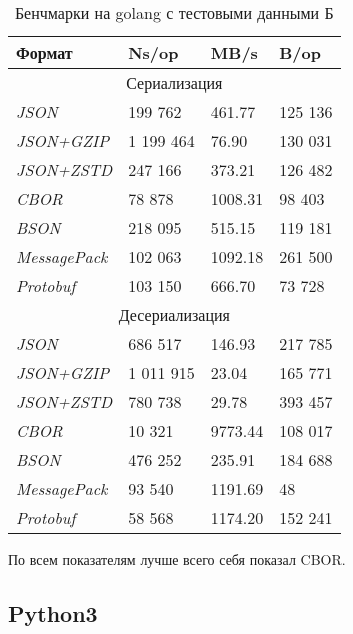 \begin{table}[ht!]
\centering
\caption{Бенчмарки на golang с тестовыми данными Б}
\begin{tabular}{|l|l|l|l|} 
\hline
\textbf{Формат}      & \textbf{Ns/op} & \textbf{MB/s} & \textbf{B/op}  \\ 
\hline
\multicolumn{4}{|c|}{Сериализация}                                        \\ 
\hline
\textit{JSON}        & 199 762         & 461.77        & 125 136         \\ 
\hline
\textit{JSON+GZIP}   & 1 199 464        & 76.90         & 130 031         \\ 
\hline
\textit{JSON+ZSTD}   & 247 166         & 373.21        & 126 482         \\ 
\hline
\textit{CBOR}        & 78 878          & 1008.31       & 98 403          \\ 
\hline
\textit{BSON}        & 218 095         & 515.15        & 119 181         \\ 
\hline
\textit{MessagePack} & 102 063         & 1092.18       & 261 500         \\ 
\hline
\textit{Protobuf}    & 103 150         & 666.70        & 73 728          \\ 
\hline
\multicolumn{4}{|c|}{Десериализация}                                      \\ 
\hline
\textit{JSON}        & 686 517         & 146.93        & 217 785         \\ 
\hline
\textit{JSON+GZIP}   & 1 011 915        & 23.04         & 165 771         \\ 
\hline
\textit{JSON+ZSTD}   & 780 738         & 29.78         & 393 457         \\ 
\hline
\textit{CBOR}        & 10 321          & 9773.44       & 108 017         \\ 
\hline
\textit{BSON}        & 476 252         & 235.91        & 184 688         \\ 
\hline
\textit{MessagePack} & 93 540          & 1191.69       & 48             \\ 
\hline
\textit{Protobuf}    & 58 568          & 1174.20       & 152 241         \\
\hline
\end{tabular}
\end{table}

По всем показателям лучше всего себя показал CBOR.  


\clearpage

\subsection{Python3}


